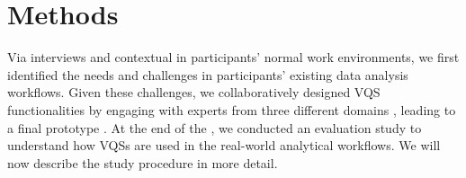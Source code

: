   \section{Methods\label{sec:methods}}
  Via interviews and contextual  in participants' normal work environments, we first identified the needs and challenges in participants' existing data analysis workflows. Given these challenges, we collaboratively designed VQS functionalities by engaging with experts from three different domains , leading to a final prototype \zvpp. At the end of the , we conducted an evaluation study to understand how VQSs are used in the real-world analytical workflows. We will now describe the study procedure in more detail.

